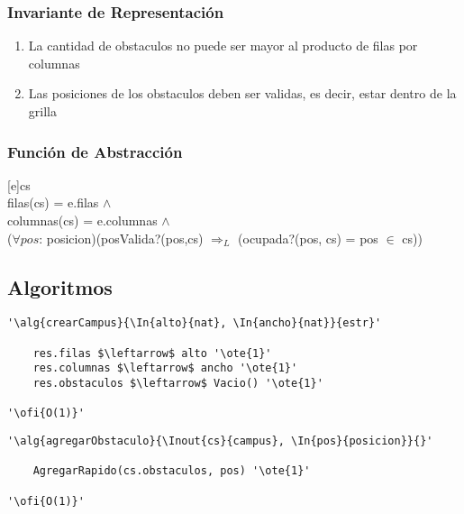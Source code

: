 \subsubsection{Invariante de Representación}

\renewcommand{\labelenumi}{(\Roman{enumi})}

\begin{enumerate}
	\item{La cantidad de obstaculos no puede ser mayor al producto de filas por columnas}
	\item{Las posiciones de los obstaculos deben ser validas, es decir, estar dentro de la grilla}

\end{enumerate}

\mbox{}

\subsubsection{Funci\'on de Abstracci\'on}

[e]{cs}{
	\\
	filas(cs) = e.filas $\land$ \\
	columnas(cs) = e.columnas $\land$ \\
	($\forall pos$: posicion)(posValida?(pos,cs) $\Rightarrow_L$ (ocupada?(pos, cs) = pos $\in$ cs))
}

\subsection{Algoritmos}

\lstset{style=alg}

\begin{lstlisting}[mathescape]
'\alg{crearCampus}{\In{alto}{nat}, \In{ancho}{nat}}{estr}'
	
    res.filas $\leftarrow$ alto '\ote{1}'
    res.columnas $\leftarrow$ ancho '\ote{1}'
    res.obstaculos $\leftarrow$ Vacio() '\ote{1}'
    
'\ofi{O(1)}'
\end{lstlisting}

\begin{lstlisting}[mathescape]
'\alg{agregarObstaculo}{\Inout{cs}{campus}, \In{pos}{posicion}}{}'

	AgregarRapido(cs.obstaculos, pos) '\ote{1}'	

'\ofi{O(1)}'
\end{lstlisting}

